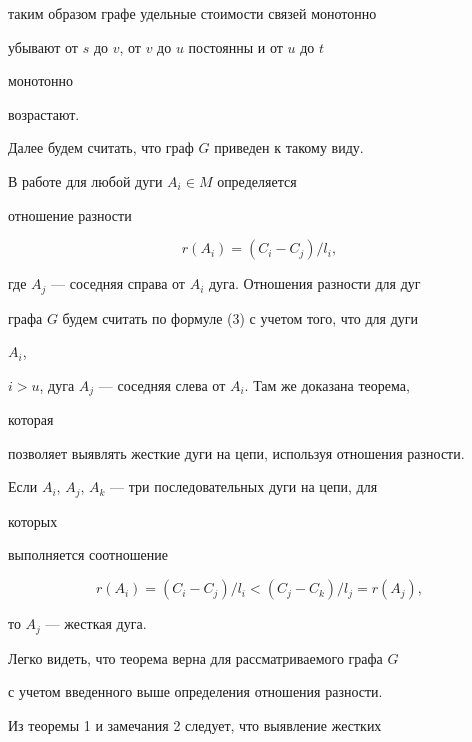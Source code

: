 таким образом графе удельные стоимости связей монотонно


убывают от $s$ до $v$, от $v$ до $u$ постоянны и от $u$ до $t$


 монотонно


возрастают.


Далее будем считать, что граф $G$ приведен к такому виду.





\begin{note} В работе \cite{Ado} для любой дуги $A_i\in M$ определяется


отношение разности


\begin{equation}


r(A_i)=(C_i-C_j)/l_i,


\end{equation}


где $A_j$ --- соседняя справа от $A_i$ дуга. Отношения разности для дуг


графа $G$ будем считать по формуле (3) с учетом того, что для дуги


$A_i$,


$i>u$, дуга $A_j$ --- соседняя слева от $A_i$. Там же доказана теорема,


которая


позволяет выявлять жесткие дуги на цепи, используя отношения разности.





Если $A_i$, $A_j$, $A_k$ --- три последовательных дуги на цепи, для


которых


выполняется соотношение


$$


r(A_i)=(C_i-C_j)/l_i < (C_j-C_k)/l_j =r(A_j),


$$


то $A_j$ --- жесткая дуга.


\end{note}





Легко видеть, что теорема верна для рассматриваемого графа $G$


с учетом введенного выше определения отношения разности.





Из теоремы 1 и замечания 2 следует, что выявление жестких


